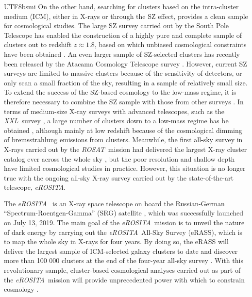 \documentclass[longauth]{aa}
\newcommand{\redshift}{\ensuremath{z}}
\newcommand{\eROSITA}{\emph{eROSITA}}
\newcommand{\ROSAT}{\emph{ROSAT}}
\newcommand{\XXL}{\emph{XXL}}
\begin{document}
\begin{CJK*}{UTF8}{bsmi}
On the other hand, searching for clusters based on the intra-cluster medium (ICM), either in X-rays or through the SZ effect, provides a clean sample for cosmological studies.
The large SZ survey carried out by the South Pole Telescope  \citep{bleem15}  has enabled the construction of a highly pure and complete sample of clusters out to redshift $\redshift\approx1.8$, based on which unbiased cosmological constraints have been obtained \citep{bocquet19}.
An even larger sample of SZ-selected clusters has recently been released by the Atacama Cosmology Telescope survey \citep{hilton21}.
However, current SZ surveys are limited to massive clusters because of the sensitivity of detectors, or only scan a small fraction of the sky, resulting in a sample of relatively small size.
To extend the success of the SZ-based cosmology to the low-mass regime, it is therefore necessary to combine the SZ sample with those from other surveys \citep[e.g.,][]{costanzi21}.
In terms of medium-size X-ray surveys with advanced telescopes, such as the \XXL\ survey \citep{peirre16}, a large number of clusters down to a low-mass regime has be obtained \citep{adami18}, although mainly at low redshift because of the cosmological dimming of bremsstrahlung emissions from clusters.
Meanwhile, the first all-sky survey in X-rays carried out by the \ROSAT\ mission \citep{rosat} had delivered the largest X-ray cluster catalog ever across the whole sky \citep{bohringer01,bohringer04,piffaretti11,boller16}, but the poor resolution and shallow depth have limited cosmological studies in practice.
However, this situation is no longer true with the ongoing all-sky X-ray survey carried out by the state-of-the-art telescope, \eROSITA.

The \eROSITA\ \citep[\textit{e}xtended \textit{RO}entgen \textit{S}urvey with an \textit{I}maging \textit{T}elescope \textit{A}rray;][]{merloni12,predehl21} is an X-ray space telescope on board the Russian-German ``Spectrum-Roentgen-Gamma'' (SRG) satellite \citep{sunyaev21}, which was successfully launched on July 13, 2019.
The main goal of the \eROSITA\ mission is to unveil the nature of dark energy by carrying out the \eROSITA\ All-Sky Survey (eRASS), which is to map the whole sky in X-rays for four years.
By doing so, the eRASS will deliver the largest sample of ICM-selected galaxy clusters to date and discover more than 100 000 clusters at the end of the four-year all-sky survey \citep{borm14}.
With this revolutionary sample, cluster-based cosmological analyses carried out as part of the \eROSITA\ mission will provide unprecedented power with which to constrain cosmology \citep{pillepich12,pillepich18}.



\end{CJK*}
\end{document}
